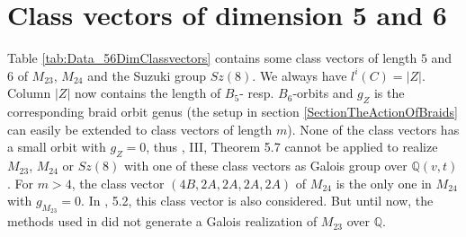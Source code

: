 \documentclass[12pt,a4paper]{article}
\numberwithin{equation}{section}
\numberwithin{table}{section}
\begin{document}
\section{Class vectors of dimension 5 and 6} \label{SectionClassvectorsOfDimension5And6}

Table \ref{tab:Data_56DimClassvectors} contains some class vectors of length $5$ and $6$ of $M_{23}$, $M_{24}$
and the Suzuki group $Sz(8)$. We always have $l^i(C) = \vert Z \vert$.
Column $ \vert Z \vert $ now contains the length of $B_5$- resp. $B_6$-orbits and $g_Z$ is the corresponding braid orbit genus 
(the setup in section \ref{SectionTheActionOfBraids} can easily be extended to class vectors of length $m$).
None of the class vectors has a small orbit with $g_Z=0$, thus \cite{RefMM2018}, III, Theorem 5.7 cannot be applied
to realize $M_{23}$, $M_{24}$ or $Sz(8)$ with one of these class vectors as Galois group over $\mathbb{Q}(v,t)$.
For $m>4$, the class vector $(4B,2A,2A,2A,2A)$ of $M_{24}$ is the only one in $M_{24}$ with $g_{M_{23}}=0$.
In \cite{RefKoe2014}, 5.2, this class vector is also considered. But until now, the methods used in \cite{RefKoe2014} 
did not generate a Galois realization of $M_{23}$ over $\mathbb{Q}$.
%
\end{document}
